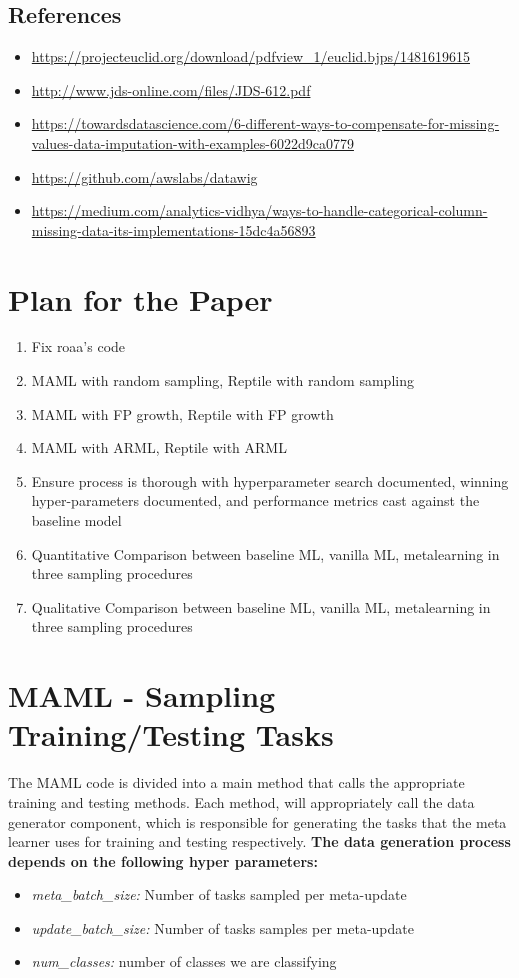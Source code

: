 \documentclass{article}
\begin{document}
\subsection*{References}
\begin{itemize}
\item \url{https://projecteuclid.org/download/pdfview_1/euclid.bjps/1481619615}

\item \url{http://www.jds-online.com/files/JDS-612.pdf}

\item\url{ https://towardsdatascience.com/6-different-ways-to-compensate-for-missing-values-data-imputation-with-examples-6022d9ca0779}
\item \url{https://github.com/awslabs/datawig}
\item \url{https://medium.com/analytics-vidhya/ways-to-handle-categorical-column-missing-data-its-implementations-15dc4a56893}
\end{itemize}




\section{Plan for the Paper}
\begin{enumerate}
\item Fix roaa’s code
\item MAML with random sampling, Reptile with random sampling
\item MAML with FP growth, Reptile with FP growth
\item MAML with ARML, Reptile with ARML
\item Ensure process is thorough with hyperparameter search documented, winning hyper-parameters documented, and performance metrics cast against the baseline model
\item Quantitative Comparison between baseline ML, vanilla ML, metalearning in three sampling procedures
\item 
Qualitative Comparison between baseline ML, vanilla ML, metalearning in three sampling procedures
\end{enumerate}


\section{MAML - Sampling Training/Testing Tasks}
The MAML code is divided into a main method that calls the appropriate training and testing methods. Each method, will appropriately call the data generator component, which is responsible for generating the tasks that the meta learner uses for training and testing respectively. \textbf{The data generation process depends on the following hyper parameters:}
\begin{itemize}
\item \textit{meta\_batch\_size:} Number of tasks sampled per meta-update
\item \textit{update\_batch\_size:} Number of tasks samples per meta-update
\item \textit{num\_classes:} number of classes we are classifying
\end{itemize}
\end{document}
